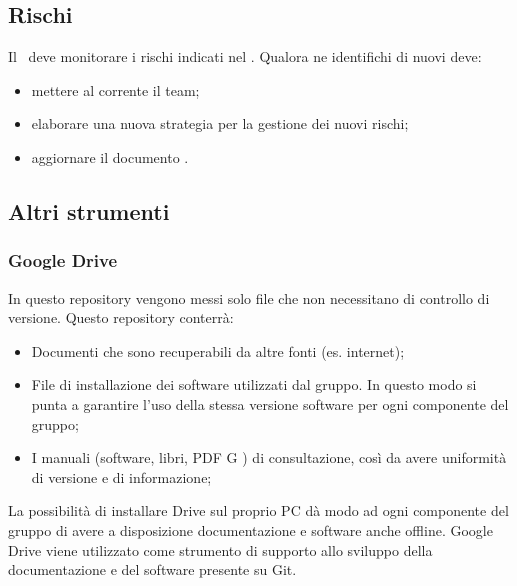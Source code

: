 \documentclass[../NormeDiProgetto.tex]{subfiles}
\begin{document}
		\subsection{Rischi}
			Il \responsabilediprogetto\ deve monitorare i rischi indicati nel \pianodiprogetto. Qualora ne identifichi di nuovi deve:
			\begin{itemize}
				\item mettere al corrente il team;
				\item elaborare una nuova strategia per la gestione dei nuovi rischi;
				\item aggiornare il documento \pianodiprogetto.
			\end{itemize}
		\subsection{Altri strumenti}
			\subsubsection{Google Drive}
				In questo repository vengono messi solo file che non necessitano di controllo di versione.
				Questo repository conterrà:
				\begin{itemize}
					\item Documenti che sono recuperabili da altre fonti (es. internet);
					\item File di installazione dei software utilizzati dal gruppo. In questo modo si punta a garantire l’uso della stessa versione software per ogni componente del gruppo;
					\item I manuali (software, libri, PDF G ) di consultazione, così da avere uniformità di versione e di informazione;
				\end{itemize}
				La possibilità di installare Drive sul proprio PC dà modo ad ogni componente del gruppo di avere a disposizione documentazione e software anche offline. Google Drive viene utilizzato come strumento di supporto allo sviluppo della documentazione e del software presente su Git.
\end{document}
